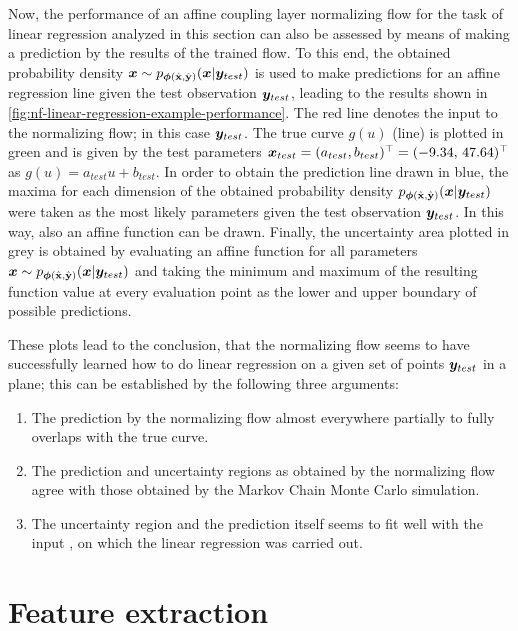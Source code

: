\documentclass[a4paper,12pt]{report}
\def\lk#1{{\color{black}{#1}}}
\begin{document}
Now, the performance of an affine coupling layer normalizing flow for the task of linear regression analyzed in this section can also be assessed by means of making a prediction by the results of the trained flow. To this end, the obtained probability density $\bm{x} \sim p_{\bm{\phi}(\hat{\boldsymbol{\mathbf{x}}},\hat{\boldsymbol{\mathbf{y}}})}(\bm{x}|\bm{y}_{test})$ is used to make predictions for an affine regression line given the test observation $\bm{y}_{test}$, leading to the results shown in \cref{fig:nf-linear-regression-example-performance}. The red line denotes the input to the normalizing flow; in this case $\bm{y}_{test}$. The true curve $g(u)$ (line) is plotted in green and is given by the test parameters $\bm{x}_{test} = (a_{test}, b_{test})^\top = (-9.34,\,47.64)^\top$ as $g(u) = a_{test}u + b_{test}$. In order to obtain the prediction line drawn in blue, the maxima for each dimension of the obtained probability density $p_{\bm{\phi}(\hat{\boldsymbol{\mathbf{x}}},\hat{\boldsymbol{\mathbf{y}}})}(\bm{x}|\bm{y}_{test})$ were taken as the most likely parameters given the test observation $\bm{y}_{test}$. In this way, also an affine function can be drawn. Finally, the uncertainty area plotted in grey is obtained by evaluating an affine function for all parameters $\bm{x} \sim p_{\bm{\phi}(\hat{\boldsymbol{\mathbf{x}}},\hat{\boldsymbol{\mathbf{y}}})}(\bm{x}|\bm{y}_{test})$ and taking the minimum and maximum of the resulting function value at every evaluation point as the lower and upper boundary of possible predictions.

These plots lead to the conclusion, that the normalizing flow seems to have successfully learned how to do linear regression on a given set of points $\bm{y}_{test}$ in a plane; this can be established by the following three arguments:
\begin{enumerate}
\item The prediction by the normalizing flow almost everywhere partially to fully overlaps with the true curve.
\item The prediction and uncertainty regions as obtained by the normalizing flow agree with those obtained by the Markov Chain Monte Carlo simulation.
\item The uncertainty region and the prediction itself seems to fit well with the input \lk{data}, on which the linear regression was carried out.
\end{enumerate}

\FloatBarrier
\section{Feature extraction}
\end{document}

